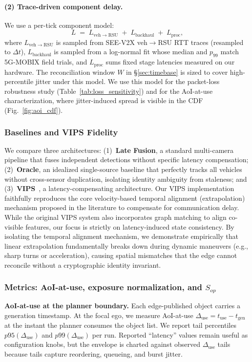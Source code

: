 \paragraph{(2) Trace-driven component delay.}
We use a per-tick component model:
\[
L \;=\; L_{\mathrm{veh}\rightarrow\mathrm{RSU}} \;+\; L_{\mathrm{backhaul}} \;+\; L_{\mathrm{proc}},
\]
where $L_{\mathrm{veh}\rightarrow\mathrm{RSU}}$ is sampled from SEE-V2X veh$\rightarrow$RSU RTT traces (resampled to $\Delta t$), $L_{\mathrm{backhaul}}$ is sampled from a log-normal fit whose median and $p_{99}$ match 5G-MOBIX field trials, and $L_{\mathrm{proc}}$ sums fixed stage latencies measured on our hardware. The reconciliation window $W$ in \S\ref{sec:timebase} is sized to cover high-percentile jitter under this model. We use this model for the packet-loss robustness study (Table~\ref{tab:loss_sensitivity}) and for the AoI-at-use characterization, where jitter-induced spread is visible in the CDF (Fig.~\ref{fig:aoi_cdf}).

\subsubsection{Baselines and VIPS Fidelity}
\label{sec:eval:baselines}
We compare three architectures: (1)~\textbf{Late Fusion}, a standard multi-camera pipeline that fuses independent detections without specific latency compensation; (2)~\textbf{Oracle}, an idealized single-source baseline that perfectly tracks all vehicles without cross-sensor duplication, isolating identity ambiguity from staleness; and (3)~\textbf{VIPS}~\cite{vips2022}, a latency-compensating architecture. Our VIPS implementation faithfully reproduces the core velocity-based temporal alignment (extrapolation) mechanism proposed in the literature to compensate for communication delay. While the original VIPS system also incorporates graph matching to align co-visible features, our focus is strictly on latency-induced state consistency. By isolating the temporal alignment mechanism, we demonstrate empirically that linear extrapolation fundamentally breaks down during dynamic maneuvers (e.g., sharp turns or acceleration), causing spatial mismatches that the edge cannot reconcile without a cryptographic identity invariant.

\subsubsection{Metrics: AoI-at-use, exposure normalization, and $S_{op}$}
\label{sec:eval:metrics}
\textbf{AoI-at-use at the planner boundary.}
Each edge-published object carries a generation timestamp. At the focal ego, we measure AoI-at-use
$\Delta_{\text{use}} = t_{\text{use}} - t_{\text{gen}}$ at the instant the planner consumes the object list. We report tail percentiles $p95(\Delta_{\text{use}})$ and $p99(\Delta_{\text{use}})$ per run. Reported ``latency'' values remain useful as configuration knobs, but the envelope is charted against observed $\Delta_{\text{use}}$ tails because tails capture reordering, queueing, and burst jitter.

